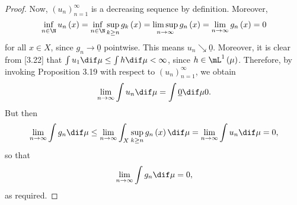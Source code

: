 \documentclass[pmath450]{subfiles}
\begin{document}
\begin{proof}
        Now, $\left( u_{n} \right)^{\infty}_{n=1}$ is a decreasing sequence by definition. Moreover,
        \begin{equation*}
            \inf_{n\in\N} u_n\left( x \right) = \inf_{n\in\N}\sup_{k\geq n}g_k\left( x \right)=\limsup_{n\to\infty}g_n\left( x \right)=\lim_{n\to\infty}g_n\left( x \right)=0
        \end{equation*}
        for all $x\in X$, since $g_n\to\underline{0}$ pointwise. This means $u_n\searrow\underline{0}$. Moreover, it is clear from [3.22] that $\int u_1\dif\mu\leq\int h\dif\mu < \infty$, since $h\in\lone\left( \mu \right)$. Therefore, by invoking Proposition 3.19 with respect to $\left( u_{n} \right)^{\infty}_{n=1}$, we obtain
        \begin{equation*}
            \lim_{n\to\infty} \int u_n\dif\mu = \int\underline{0}\dif\mu  0.
        \end{equation*}
        But then
        \begin{equation*}
            \lim_{n\to\infty}\int g_n\dif\mu\leq\lim_{n\to\infty}\int^{}_{X}\sup_{k\geq n}g_n\left( x \right)\dif\mu = \lim_{n\to\infty}\int u_n\dif\mu = 0,
        \end{equation*}
        so that
        \begin{equation*}
            \lim_{n\to\infty}\int g_n\dif\mu = 0,
        \end{equation*}
        as required.
    \end{proof}
\end{document}
